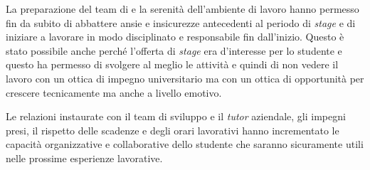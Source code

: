 La preparazione del team di \visione{} e la serenità dell'ambiente di lavoro hanno permesso fin da subito di abbattere ansie e insicurezze antecedenti al periodo di \textit{stage} e di iniziare a lavorare in modo disciplinato e responsabile fin dall'inizio. Questo è stato possibile anche perché l'offerta di \textit{stage} era d'interesse per lo studente e questo ha permesso di svolgere al meglio le attività e quindi di non vedere il lavoro con un ottica di impegno universitario ma con un ottica di opportunità per crescere tecnicamente ma anche a livello emotivo.

Le relazioni instaurate con il team di sviluppo e il \textit{tutor} aziendale, gli impegni presi, il rispetto delle scadenze e degli orari lavorativi hanno incrementato le capacità organizzative e collaborative dello studente che saranno sicuramente utili nelle prossime esperienze lavorative.